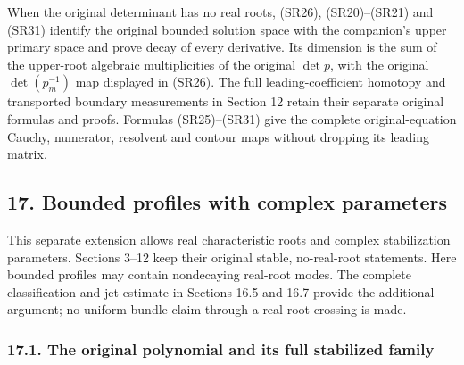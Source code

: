 \documentclass[
  11pt,
]{article}
\begin{document}
When the original determinant has no real roots, (SR26), (SR20)--(SR21)
and (SR31) identify the original bounded solution space with the
companion's upper primary space and prove decay of every derivative. Its
dimension is the sum of the upper-root algebraic multiplicities of the
original \(\det p\), with the original \(\det(p_m^{-1})\) map displayed
in (SR26). The full leading-coefficient homotopy and transported
boundary measurements in Section 12 retain their separate original
formulas and proofs. Formulas (SR25)--(SR31) give the complete
original-equation Cauchy, numerator, resolvent and contour maps without
dropping its leading matrix.

\subsection{17. Bounded profiles with complex
parameters}\label{AN03-STB-BOUNDED-001}

This separate extension allows real characteristic roots and complex
stabilization parameters. Sections 3--12 keep their original stable,
no-real-root statements. Here bounded profiles may contain nondecaying
real-root modes. The complete classification and jet estimate in
Sections 16.5 and 16.7 provide the additional argument; no uniform
bundle claim through a real-root crossing is made.

\subsubsection{17.1. The original polynomial and its full stabilized
family}\label{the-original-polynomial-and-its-full-stabilized-family}
\end{document}

